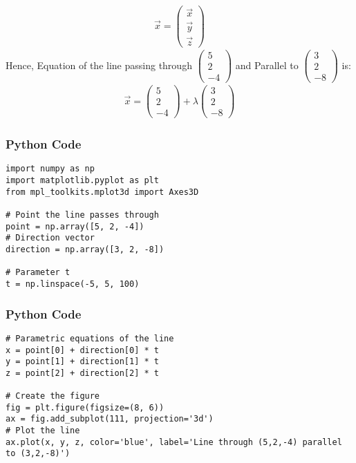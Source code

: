\documentclass{beamer}
\begin{document}
\begin{frame}
\begin{align}
\vec{x}= \begin{pmatrix}\vec{x} \\\vec{y} \\\vec{z}\end{pmatrix}
\end{align}
Hence, Equation of the line passing through $\begin{pmatrix}5 \\2 \\-4\end{pmatrix}$ and Parallel to $\begin{pmatrix}3 \\2 \\-8\end{pmatrix}$ is:\\
\begin{align*}
\vec{x} = \begin{pmatrix}5 \\2 \\-4\end{pmatrix} + \lambda \begin{pmatrix}3 \\2 \\-8\end{pmatrix}
\end{align*}
\end{frame}

\begin{frame}[fragile]
    \frametitle{Python Code}
    \begin{lstlisting}
import numpy as np
import matplotlib.pyplot as plt
from mpl_toolkits.mplot3d import Axes3D

# Point the line passes through
point = np.array([5, 2, -4])
# Direction vector
direction = np.array([3, 2, -8])

# Parameter t
t = np.linspace(-5, 5, 100)
\end{lstlisting}
\end{frame}

\begin{frame}[fragile]
\frametitle{Python Code}
\begin{lstlisting}
# Parametric equations of the line
x = point[0] + direction[0] * t
y = point[1] + direction[1] * t
z = point[2] + direction[2] * t

# Create the figure
fig = plt.figure(figsize=(8, 6))
ax = fig.add_subplot(111, projection='3d')
# Plot the line
ax.plot(x, y, z, color='blue', label='Line through (5,2,-4) parallel to (3,2,-8)')
    \end{lstlisting}
\end{frame}
\end{document}
